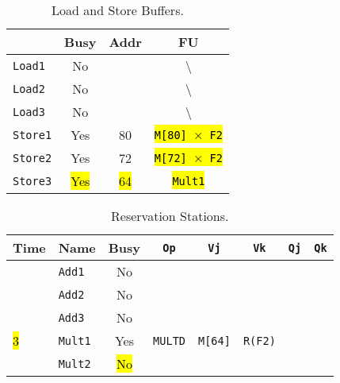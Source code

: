 \begin{enumerate}
    \begin{table}[!htp]
        \centering
        \begin{tabular}{@{} l | c c c @{}}
            \toprule
                                & Busy      & Addr      & FU   \\
            \midrule
            \texttt{Load1}      & No        &           & \textbackslash                    \\ [.3em]
            \texttt{Load2}      & No        &           & \textbackslash                    \\ [.3em]
            \texttt{Load3}      & No        &           & \textbackslash                    \\
            \cmidrule{1-4}
            \texttt{Store1}     & Yes       & 80        & \hl{\texttt{M[80] $\times$ F2}}   \\ [.3em]
            \texttt{Store2}     & Yes       & 72        & \hl{\texttt{M[72] $\times$ F2}}   \\ [.3em]
            \texttt{Store3}     & \hl{Yes}  & \hl{64}   & \hl{\texttt{Mult1}}               \\
            \bottomrule
        \end{tabular}
        \caption*{Load and Store Buffers.}
    \end{table}

    \begin{table}[!htp]
        \centering
        \begin{tabular}{@{} l l | c c c c c c @{}}
            \toprule
            Time        & Name              & Busy      & \texttt{Op}           & \texttt{Vj}           & \texttt{Vk}           & \texttt{Qj}           & \texttt{Qk}       \\
            \midrule
                        & \texttt{Add1}     & No        &                       &                       &                       &                       &                   \\ [.3em]
                        & \texttt{Add2}     & No        &                       &                       &                       &                       &                   \\ [.3em]
                        & \texttt{Add3}     & No        &                       &                       &                       &                       &                   \\ [.3em]
            \hl{3}      & \texttt{Mult1}    & Yes       & \texttt{MULTD}        & \texttt{M[64]}        & \texttt{R(F2)}        &                       &                   \\ [.3em]
                        & \texttt{Mult2}    & \hl{No}   &                       &                       &                       &                       &                   \\
            \bottomrule
        \end{tabular}
        \caption*{Reservation Stations.}
    \end{table}


\end{enumerate}
